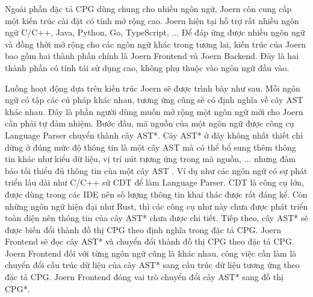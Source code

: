 Ngoài phần đặc tả CPG dùng chung cho nhiều ngôn ngữ, Joern còn cung cấp một kiến trúc cài đặt có tính mở rộng cao.
Joern hiện tại hỗ trợ rất nhiều ngôn ngữ C/C++, Java, Python, Go, TypeScript, ...
Để đáp ứng được nhiều ngôn ngữ và đồng thời mở rộng cho các ngôn ngữ khác trong tương lai, kiến trúc của Joern bao gồm hai thành phần chính là Joern Frontend và Joern Backend.
Đây là hai thành phần có tính tái sử dụng cao, không phụ thuộc vào ngôn ngữ đầu vào.

Luồng hoạt động dựa trên kiến trúc Joern sẽ được trình bày như sau.
Mỗi ngôn ngữ có tập các cú pháp khác nhau, tương ứng cũng sẽ có định nghĩa về cây AST khác nhau.
Đây là phần người dùng muốn mở rộng một ngôn ngữ mới cho Joern cần phải tự đảm nhiệm.
Bước đầu, mã nguồn của một ngôn ngữ được công cụ Language Parser chuyển thành cây AST*.
Cây AST* ở đây không nhất thiết chỉ dừng ở đúng mức độ thông tin là một cây AST mà có thể bổ sung thêm thông tin khác như kiểu dữ liệu, vị trí nút tương ứng trong mã nguồn, ...
nhưng đảm bảo tối thiểu đủ thông tin của một cây AST .
Ví dụ như các ngôn ngữ có sự phát triển lâu dài như C/C++ sử CDT \cite{eclipseEclipseCC} để làm Language Parser.
CDT là công cụ lớn, được dùng trong các IDE nên số lượng thông tin khai thác được rất đáng kể.
Còn những ngôn ngữ hiện đại như Rust, thì các công cụ như này chưa được phát triển toàn diện nên thông tin của cây AST* chưa được chi tiết.
Tiếp theo, cây AST* sẽ được biến đổi thành đồ thị CPG theo định nghĩa trong đặc tả CPG.
Joern Frontend sẽ đọc cây AST* và chuyển đổi thành đồ thị CPG theo đặc tả CPG.
Joern Frontend đối với từng ngôn ngữ cũng là khác nhau, công việc cần làm là chuyển đổi cấu trúc dữ liệu của cây AST* sang cấu trúc dữ liệu tương ứng theo đặc tả CPG.
Joern Frontend đóng vai trò chuyển đổi cây AST* sang đồ thị CPG*.

